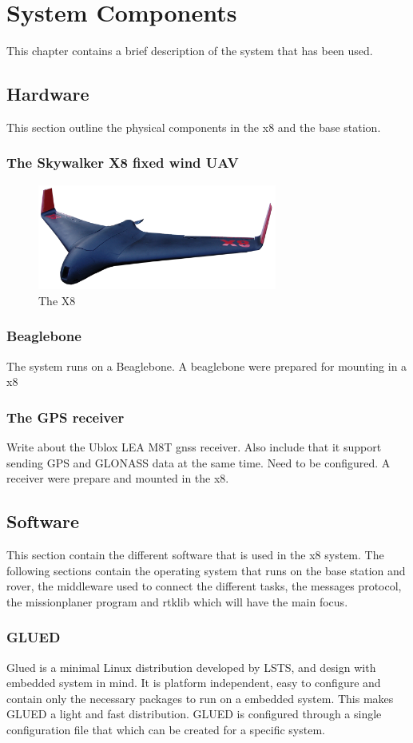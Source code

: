 
\chapter{System Components}
This chapter contains a brief description of the system that has been used.
\section{Hardware}
This section outline the physical components in the x8 and the base station.
\subsection{The Skywalker X8 fixed wind UAV}
\begin{figure}[H]
	\centering
		\includegraphics[width=0.7\textwidth]{figs/Wing-X8_white-bgd2.png}
		\caption{The X8 \citep{skywalkerx8}}
		\label{figure:skywalkerX8}
\end{figure}
\subsection{Beaglebone}
The system runs on a Beaglebone. A beaglebone were prepared for mounting in a x8
\subsection{The GPS receiver}
Write about the Ublox LEA M8T gnss receiver. Also include that it support sending GPS and GLONASS data at the same time. Need to be configured. A receiver were prepare and mounted in the x8.

\section{Software}
This section contain the different software that is used in the x8 system. The following sections contain the operating system that runs on the base station and rover, the middleware used to connect the different tasks, the messages protocol, the missionplaner program and rtklib which will have the main focus.\subsection{GLUED}
Glued is a minimal Linux distribution developed by LSTS, and design with embedded system in mind. It is platform independent, easy to configure and contain only the necessary packages to run on a embedded system. This makes GLUED a light and fast distribution. GLUED is configured through a single configuration file that which can be created for a specific system. 
